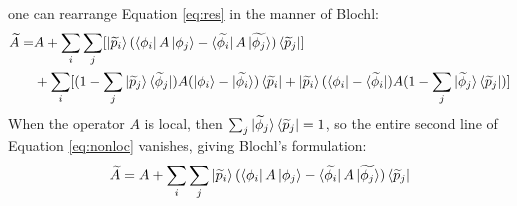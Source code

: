 \documentclass[12pt]{article}
\begin{document}
one can rearrange Equation \ref{eq:res} in the manner of Blochl\cite{blochl}:
\begin{equation}
\begin{split}
\widetilde{A}= & A+\sum_i\sum_j[\ket{\widetilde{p}_i}(\bra{\phi_i}A\ket{\phi_j}
-\bra{\widetilde{\phi_i}}A\ket{\widetilde{\phi_j}})\bra{\widetilde{p}_j}] \\
& +\sum_i[(1-\sum_j\ket{\widetilde{p}_j}\bra{\widetilde{\phi}_j})A(\ket{\phi_i}-\ket{\widetilde{\phi_i}})
\bra{\widetilde{p}_i}+\ket{\widetilde{p}_i}
(\bra{\phi_i}-\bra{\widetilde{\phi}_i})A(1-\sum_j\ket{\widetilde{\phi}_j}\bra{\widetilde{p}_j})]
\end{split}
\label{eq:nonloc}
\end{equation}
When the operator $A$ is local, then $\sum_j\ket{\widetilde{\phi}_j}\bra{\widetilde{p}_j}=1$,
so the entire second line of Equation \ref{eq:nonloc} vanishes, giving Blochl's formulation:\cite{blochl}
\begin{equation}
\widetilde{A}=A+\sum_i\sum_j\ket{\widetilde{p}_i}(\bra{\phi_i}A\ket{\phi_j}
-\bra{\widetilde{\phi_i}}A\ket{\widetilde{\phi_j}})\bra{\widetilde{p}_j}
\label{eq:loc1}
\end{equation}
\end{document}
